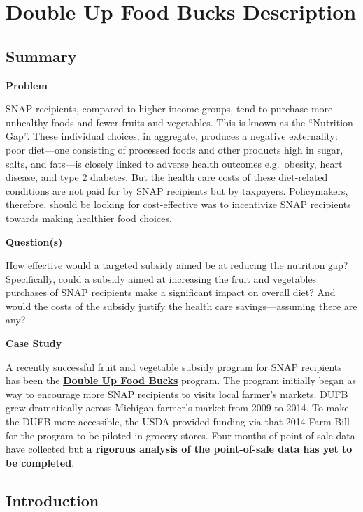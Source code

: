 \documentclass[11pt,letterpaper,]{book}
\begin{document}
\chapter{Double Up Food Bucks Description}\label{DUFB}

\section{Summary}\label{summary}

\textbf{Problem}

SNAP recipients, compared to higher income groups, tend to purchase more
unhealthy foods and fewer fruits and vegetables. This is known as the
``Nutrition Gap''. These individual choices, in aggregate, produces a
negative externality: poor diet---one consisting of processed foods and
other products high in sugar, salts, and fats---is closely linked to
adverse health outcomes e.g.~obesity, heart disease, and type 2
diabetes. But the health care costs of these diet-related conditions are
not paid for by SNAP recipients but by taxpayers. Policymakers,
therefore, should be looking for cost-effective was to incentivize SNAP
recipients towards making healthier food choices.

\textbf{Question(s)}

How effective would a targeted subsidy aimed be at reducing the
nutrition gap? Specifically, could a subsidy aimed at increasing the
fruit and vegetables purchases of SNAP recipients make a significant
impact on overall diet? And would the costs of the subsidy justify the
health care savings---assuming there are any?

\textbf{Case Study}

A recently successful fruit and vegetable subsidy program for SNAP
recipients has been the
\href{http://www.doubleupfoodbucks.org/}{\textbf{Double Up Food Bucks}}
program. The program initially began as way to encourage more SNAP
recipients to visits local farmer's markets. DUFB grew dramatically
across Michigan farmer's market from 2009 to 2014. To make the DUFB more
accessible, the USDA provided funding via that 2014 Farm Bill for the
program to be piloted in grocery stores. Four months of point-of-sale
data have collected but \textbf{a rigorous analysis of the point-of-sale
data has yet to be completed}.

\section{Introduction}\label{introduction}
\end{document}
